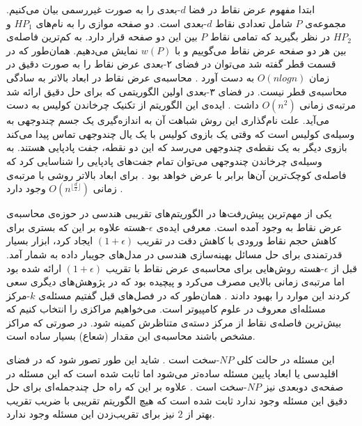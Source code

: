ابتدا مفهوم عرض نقاط در فضا $d$-بعدی را به صورت غیررسمی بیان می‌کنیم.
 مجموعه‌ی $P$ شامل تعدادی نقاط $d$-بعدی است. دو صفحه موازی را به نام‌های $HP_1$ و $HP_2$ در نظر بگیرید که تمامی نقاط $P$ بین این دو صفحه قرار دارد. به کم‌ترین فاصله‌ی بین هر دو صفحه عرض نقاط می‌گوییم و با $w(P)$ نمایش می‌دهیم.
  همان‌طور که در قسمت قطر گفته شد می‌توان در فضای ۲-بعدی عرض نقاط را به صورت دقیق در زمان $O(n log n)$ به دست آورد . محاسبه‌ی عرض نقاط در ابعاد بالاتر به سادگی محاسبه‌ی قطر نیست. در فضای ۳-بعدی اولین الگوریتمی که برای حل دقیق ارائه شد مرتبه‌ی زمانی $O(n^2)$ داشت . ایده‌ی این الگوریتم از تکنیک چرخاندن کولیس  به دست می‌آید. علت نام‌گذاری این روش شباهت آن به اندازه‌گیری یک جسم چندوجهی به وسیله‌ی کولیس است که وقتی یک بازوی کولیس با یک یال چندوجهی تماس پیدا می‌کند بازوی دیگر به یک نقطه‌ی چندوجهی می‌رسد که این دو نقطه، جفت پادپایی  هستند. به وسیله‌ی چرخاندن چندوجهی می‌توان تمام جفت‌های پادپایی را شناسایی کرد که فاصله‌ی کوچک‌ترین آن‌ها برابر با عرض خواهد بود . برای ابعاد بالاتر روشی با مرتبه‌ی زمانی
   $O(n^{\lfloor \frac{d}{2} \rfloor})$
وجود دارد .

یکی از مهم‌ترین پیش‌رفت‌ها در الگوریتم‌های تقریبی هندسی در حوزه‌ی محاسبه‌ی عرض نقاط به وجود آمده است. معرفی ایده‌ی $\epsilon$-هسته علاوه بر این که بستری برای کاهش حجم نقاط ورودی با کاهش دقت در تقریب $(1+ \epsilon)$ ایجاد کرد، ابزار بسیار قدرتمندی برای حل مسائل بهینه‌سازی هندسی در مدل‌های جویبار داده به شمار آمد. قبل از $\epsilon$-هسته روش‌هایی برای محاسبه‌ی عرض نقاط با تقریب  $(1+ \epsilon)$  ارائه شده بود  اما مرتبه‌ی زمانی بالایی مصرف می‌کرد و پیچیده بود که در پژوهش‌های دیگری سعی کردند این موارد را بهبود دادند . 
همان‌طور که در فصل‌های قبل گفتیم مسئله‌ی $k$-مرکز مسئله‌ای معروف در علوم کامپیوتر است. می‌خواهیم مراکزی را انتخاب کنیم که بیش‌ترین فاصله‌ی نقاط از مرکز دسته‌ی متناظرش کمینه شود. در صورتی که مراکز مشخص باشند محاسبه‌ی این مقدار (شعاع) بسیار ساده است.

این مسئله در حالت کلی $NP$-سخت است . شاید این طور تصور شود که در فضای اقلیدسی یا ابعاد پایین مسئله ساده‌تر می‌شود اما ثابت شده است که این مسئله در صفحه‌ی دوبعدی نیز $NP$-سخت است . علاوه بر این که راه حل چندجمله‌ای برای حل دقیق این مسئله وجود ندارد ثابت شده است که هیچ الگوریتم تقریبی با ضریب تقریب بهتر از $2$ نیز برای تقریب‌زدن این مسئله وجود ندارد.


